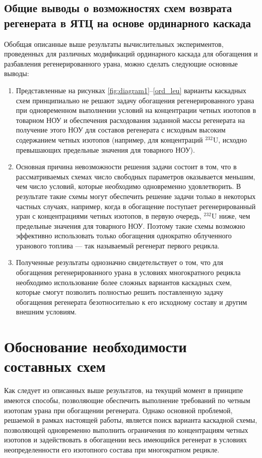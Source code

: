 \subsection{Общие выводы о возможностях схем возврата регенерата в ЯТЦ на основе ординарного каскада}

Обобщая описанные выше результаты вычислительных экспериментов, проведенных для различных модификаций ординарного каскада для обогащения и разбавления регенерированного урана, можно сделать следующие основные выводы:
\begin{enumerate}
  \item Представленные на рисунках \ref{fig:diagram1}--\ref{ord_leu} варианты каскадных схем принципиально не решают задачу обогащения регенерированного урана при одновременном выполнении условий на концентрации четных изотопов в товарном НОУ и обеспечения расходования заданной массы регенерата на получение этого НОУ для составов регенерата с исходным высоким содержанием четных изотопов (например, для концентраций $^{232}$U, исходно превышающих предельные значения для товарного НОУ). 
  \item Основная причина невозможности решения задачи состоит в том, что в рассматриваемых схемах число свободных параметров оказывается меньшим, чем число условий, которые необходимо одновременно удовлетворить. В результате такие схемы могут обеспечить решение задачи только в некоторых частных случаях, например, когда в обогащение поступает регенерированный уран с концентрациями четных изотопов, в первую очередь, $^{232}$U ниже, чем предельные значения для товарного НОУ. Поэтому такие схемы возможно эффективно использовать только обогащения однократно облученного уранового топлива --- так называемый регенерат первого рецикла. 
  \item Полученные результаты однозначно свидетельствует о том, что для обогащения регенерированного урана в условиях многократного рецикла необходимо использование более сложных вариантов каскадных схем, которые смогут позволить полностью решить поставленную задачу обогащения регенерата безотносительно к его исходному составу и другим внешним условиям.
\end{enumerate}

\section{Обоснование необходимости составных схем}

Как следует из описанных выше результатов, на текущий момент в принципе имеются способы, позволяющие обеспечить выполнение требований по четным изотопам урана при обогащении регенерата. Однако основной проблемой, решаемой в рамках настоящей работы, является поиск варианта каскадной схемы, позволяющей одновременно выполнить ограничения по концентрациям четных изотопов и задействовать в обогащении весь имеющийся регенерат в условиях неопределенности его изотопного состава при многократном рецикле.

